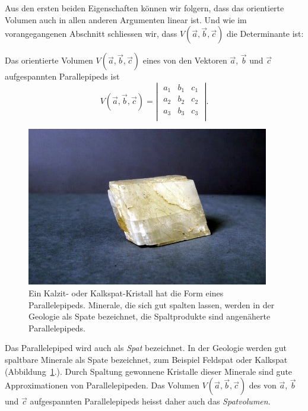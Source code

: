 Aus den ersten beiden Eigenschaften können wir folgern, dass das orientierte
Volumen auch in allen anderen Argumenten linear ist.
Und wie im vorangegangenen Abschnitt schliessen wir,
dass $V(\vec a,\vec b,\vec c)$ die Determinante ist:
\begin{satz}
Das orientierte Volumen $V(\vec a,\vec b,\vec c)$ eines von den Vektoren
$\vec a$, $\vec b$ und $\vec c$ aufgespannten Parallepipeds  ist
\[
V(\vec a,\vec b,\vec c)=\left|\;\begin{matrix}
a_1&b_1&c_1\\
a_2&b_2&c_2\\
a_3&b_3&c_3\\
\end{matrix}\;\right|.
\]
\end{satz}
\begin{figure}
\centering
\includegraphics[width=0.7\hsize]{graphics/calcite.jpg}
\caption{Ein Kalzit- oder Kalkspat-Kristall hat die Form eines Parallelepipeds.
Minerale, die sich gut spalten lassen, werden in der Geologie als Spate
bezeichnet, die Spaltprodukte sind angenäherte Parallelepipeds.
\label{skript:orientierung:calcite}}
\end{figure}
Das Parallelepiped wird auch als {\em Spat} bezeichnet.
%
In der Geologie werden gut spaltbare Minerale als Spate bezeichnet, zum
Beispiel Feldspat oder Kalkspat (Abbildung~\ref{skript:orientierung:calcite}.).
Durch Spaltung gewonnene Kristalle dieser Minerale sind gute Approximationen
von Parallelepipeden.
Das Volumen $V(\vec{a},\vec{b},\vec{c})$ des von $\vec{a}$, $\vec{b}$ und
$\vec{c}$ aufgespannten Parallelepipeds heisst daher auch das
{\em Spatvolumen}.
%

